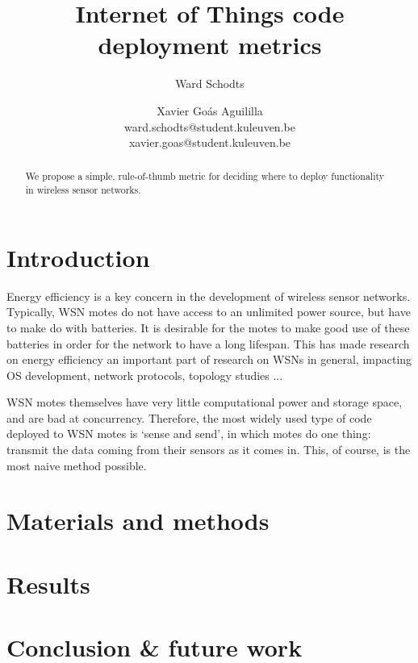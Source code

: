 \documentclass{article}
\title{Internet of Things code deployment metrics}
\author{Ward Schodts \and Xavier Go\'as Aguililla \\ ward.schodts@student.kuleuven.be \\ xavier.goas@student.kuleuven.be}
\begin{document}
\maketitle

\begin{abstract}
We propose a simple, rule-of-thumb metric for deciding where to deploy
functionality in wireless sensor networks. 
  
\lipsum[1]
\end{abstract}

\section{Introduction}


Energy efficiency is a key concern in the development of wireless
sensor networks. Typically, WSN motes do not have access to an
unlimited power source, but have to make do with batteries. It is
desirable for the motes to make good use of these batteries in order
for the network to have a long lifespan. This has made research on
energy efficiency an important part of research on WSNs in general,
impacting OS development, network protocols, topology studies ...

WSN motes themselves have very little computational power and storage space, and
are bad at concurrency. Therefore, the most widely used type of code deployed to
WSN motes is `sense and send', in which motes do one thing: transmit the data
coming from their sensors as it comes in. This, of course, is the most naive
method possible.

\section{Materials and methods}

\lipsum[3]

\section{Results}
\lipsum[4]
\section{Conclusion \& future work}

\lipsum[5]



\end{document}
